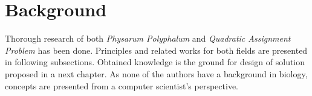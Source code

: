 \chapter{Background}
\label{chapter:background}

Thorough research of both \textit{Physarum Polyphalum} and \textit{Quadratic Assignment Problem} has been done. Principles and related works for both fields are presented in following subsections. Obtained knowledge is the ground for design of solution proposed in a next chapter. As none of the authors have a background in biology, concepts are presented from a computer scientist's perspective.





